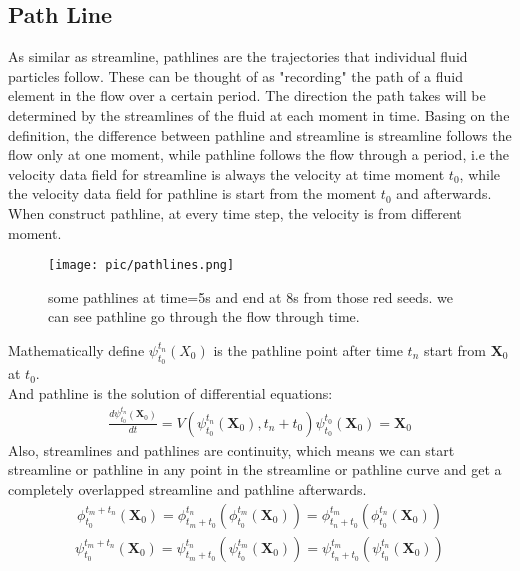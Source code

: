 \documentclass[
     11pt,         %
     a4paper,      %
     oneside,
     ]{article}
\newcommand{\vect}[1]{\boldsymbol{#1}}
\begin{document}
	\subsection{Path Line}
	As similar as streamline, pathlines are the trajectories that individual fluid particles follow. These can be thought of as "recording" the path of a fluid element in the flow over a certain period. The direction the path takes will be determined by the streamlines of the fluid at each moment in time\cite{PathlineDefine}. Basing on the definition, the difference between pathline and streamline is streamline follows the flow only at one moment, while pathline follows the  flow  through a period, i.e the velocity data field for streamline is always the velocity at time moment $t_{0}$, while the velocity data field for pathline is start from the moment $t_{0}$ and afterwards. When construct pathline, at every time step, the velocity is from different moment.\\
		\begin{figure}[H]
			\centering
			\texttt{[image: pic/pathlines.png]}
			\caption{{\tiny some pathlines at time=5s and end at 8s from those red seeds. we can see pathline go through the flow through time.}}
			\label{fig:pathlineatfrom5s}
		\end{figure}
	Mathematically define $\psi_{t_{0}}^{t_{n}}(X_{0})$ is the pathline point after time $t_{n}$ start from $\vect{X}_{0}$ at $t_{0}$.\\
	And pathline is the solution of differential equations:\\
	\begin{eqnarray}
		\frac{d\psi_{t_{0}}^{t_{n}}(\vect{X}_{0})}{dt}=V(\psi_{t_{0}}^{t_{n}}(\vect{X}_{0}),t_{n}+t_{0})
		\psi_{t_{0}}^{t_{0}}(\vect{X}_{0})=\vect{X}_{0}
	\end{eqnarray}
	Also, streamlines and pathlines are continuity, which means we can start streamline or pathline in any point in the streamline or pathline curve and get a completely overlapped streamline and pathline afterwards.  
	\begin{eqnarray}
	\phi_{t_{0}}^{t_{m}+t_{n}}(\vect{X}_{0})=\phi_{t_{m}+t_{0}}^{t_{n}}(\phi_{t_{0}}^{t_{m}}(\vect{X}_{0}))=\phi_{t_{n}+t_{0}}^{t_{m}}(\phi_{t_{0}}^{t_{n}}(\vect{X}_{0}))
	\end{eqnarray}
	\begin{eqnarray}
	\psi_{t_{0}}^{t_{m}+t_{n}}(\vect{X}_{0})=\psi_{t_{m}+t_{0}}^{t_{n}}(\psi_{t_{0}}^{t_{m}}(\vect{X}_{0}))=\psi_{t_{n}+t_{0}}^{t_{m}}(\psi_{t_{0}}^{t_{n}}(\vect{X}_{0}))
	\end{eqnarray}
\end{document}
